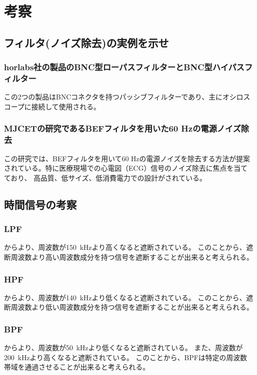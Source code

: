 \documentclass[11pt,dvipdfmx]{jarticle}
\begin{document}
\section{考察}
\subsection{フィルタ(ノイズ除去)の実例を示せ}

\subsubsection{horlabs社の製品のBNC型ローパスフィルターとBNC型ハイパスフィルター}
この2つの製品はBNCコネクタを持つパッシブフィルターであり、主にオシロスコープに接続して使用される。

\subsubsection{MJCETの研究であるBEFフィルタを用いた60 Hzの電源ノイズ除去}

この研究では、BEFフィルタを用いて60 Hzの電源ノイズを除去する方法が提案されている。特に医療現場での心電図（ECG）信号のノイズ除去に焦点を当てており、
高品質、低サイズ、低消費電力での設計がされている。

\subsection{時間信号の考察}
\subsubsection{LPF}
からより、周波数が150\ kHzより高くなると遮断されている。
このことから、遮断周波数より高い周波数成分を持つ信号を遮断することが出来ると考えられる。
\subsubsection{HPF}
からより、周波数が140\ kHzより低くなると遮断されている。
このことから、遮断周波数より低い周波数成分を持つ信号を遮断することが出来ると考えられる。
\subsubsection{BPF}
からより、周波数が50\ kHzより低くなると遮断されている。
また、周波数が200\ kHzより高くなると遮断されている。
このことから、BPFは特定の周波数帯域を通過させることが出来ると考えられる。
\end{document}
